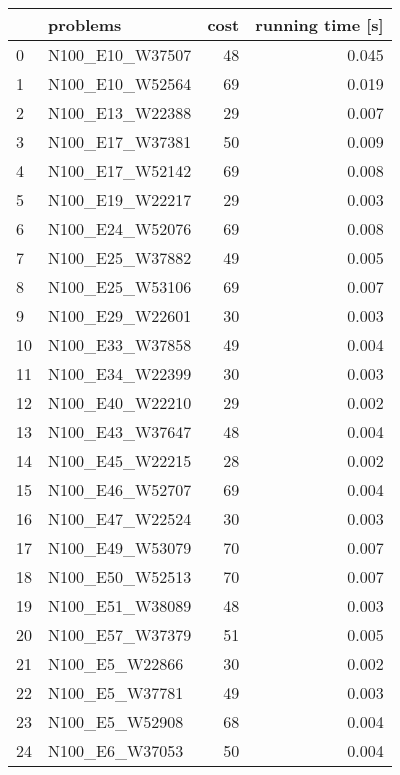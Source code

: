 \begin{table}
\centering
\begin{tabular}{llrr}
\toprule
{} &            problems &  cost &  running time [s] \\
\midrule
0  &     N100\_E10\_W37507 &    48 &             0.045 \\
1  &     N100\_E10\_W52564 &    69 &             0.019 \\
2  &     N100\_E13\_W22388 &    29 &             0.007 \\
3  &     N100\_E17\_W37381 &    50 &             0.009 \\
4  &     N100\_E17\_W52142 &    69 &             0.008 \\
5  &     N100\_E19\_W22217 &    29 &             0.003 \\
6  &     N100\_E24\_W52076 &    69 &             0.008 \\
7  &     N100\_E25\_W37882 &    49 &             0.005 \\
8  &     N100\_E25\_W53106 &    69 &             0.007 \\
9  &     N100\_E29\_W22601 &    30 &             0.003 \\
10 &     N100\_E33\_W37858 &    49 &             0.004 \\
11 &     N100\_E34\_W22399 &    30 &             0.003 \\
12 &     N100\_E40\_W22210 &    29 &             0.002 \\
13 &     N100\_E43\_W37647 &    48 &             0.004 \\
14 &     N100\_E45\_W22215 &    28 &             0.002 \\
15 &     N100\_E46\_W52707 &    69 &             0.004 \\
16 &     N100\_E47\_W22524 &    30 &             0.003 \\
17 &     N100\_E49\_W53079 &    70 &             0.007 \\
18 &     N100\_E50\_W52513 &    70 &             0.007 \\
19 &     N100\_E51\_W38089 &    48 &             0.003 \\
20 &     N100\_E57\_W37379 &    51 &             0.005 \\
21 &      N100\_E5\_W22866 &    30 &             0.002 \\
22 &      N100\_E5\_W37781 &    49 &             0.003 \\
23 &      N100\_E5\_W52908 &    68 &             0.004 \\
24 &      N100\_E6\_W37053 &    50 &             0.004 \\

\end{tabular}
\end{table}
